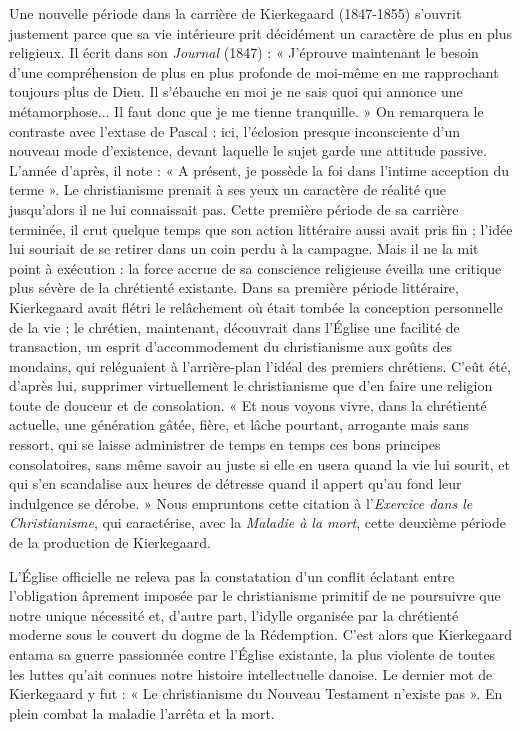 \documentclass[12pt,a4paper]{article}
\newcommand{\opage}[1]{\marginnote{\footnotesize\textit{[#1]}}}
\begin{document}
Une nouvelle période dans la carrière de Kierkegaard (1847-1855)
s'ouvrit justement parce que sa vie intérieure prit décidément un
caractère de plus en plus religieux. Il écrit dans son \emph{Journal}
(1847) : « J'éprouve maintenant le besoin d'une compréhension de
plus en plus profonde de moi-même en me rapprochant toujours
\opage{229} plus de Dieu. Il s'ébauche en moi je ne sais quoi qui annonce une
métamorphose... Il faut donc que je me tienne tranquille. » On
remarquera le contraste avec l'extase de Pascal : ici, l'éclosion
presque inconsciente d'un nouveau mode d'existence, devant
laquelle le sujet garde une attitude passive. L'année d'après, il
note : « A présent, je possède la foi dans l'intime acception du
terme ». Le christianisme prenait à ses yeux un caractère de réalité
que jusqu'alors il ne lui connaissait pas. Cette première
période de sa carrière terminée, il crut quelque temps que son
action littéraire aussi avait pris fin ; l'idée lui souriait de se retirer
dans un coin perdu à la campagne. Mais il ne la mit point à exécution :
la force accrue de sa conscience religieuse éveilla une critique
plus sévère de la chrétienté existante. Dans sa première
période littéraire, Kierkegaard avait flétri le relâchement où était
tombée la conception personnelle de la vie ; le chrétien, maintenant,
découvrait dans l'Église une facilité de transaction, un esprit d'accommodement
du christianisme aux goûts des mondains, qui reléguaient
à l'arrière-plan l'idéal des premiers chrétiens. C'eût été,
d'après lui, supprimer virtuellement le christianisme que d'en
faire une religion toute de douceur et de consolation. « Et nous
voyons vivre, dans la chrétienté actuelle, une génération gâtée,
fière, et lâche pourtant, arrogante mais sans ressort, qui se laisse
administrer de temps en temps ces bons principes consolatoires,
sans même savoir au juste si elle en usera quand la vie lui sourit,
et qui s'en scandalise aux heures de détresse quand il appert qu'au
fond leur indulgence se dérobe. » Nous empruntons cette citation
à l'\emph{Exercice dans le Christianisme}, qui caractérise, avec la \emph{Maladie
à la mort}, cette deuxième période de la production de Kierkegaard.

L'Église officielle ne releva pas la constatation d'un conflit éclatant
entre l'obligation âprement imposée par le christianisme primitif
de ne poursuivre que notre unique nécessité et, d'autre part,
l'idylle organisée par la chrétienté moderne sous le couvert du
dogme de la Rédemption. C'est alors que Kierkegaard entama sa
guerre passionnée contre l'Église existante, la plus violente de
toutes les luttes qu'ait connues notre histoire intellectuelle danoise.
Le dernier mot de Kierkegaard y fut : « Le christianisme du Nouveau
Testament n'existe pas ». En plein combat la maladie l'arrêta
et la mort.
\end{document}
